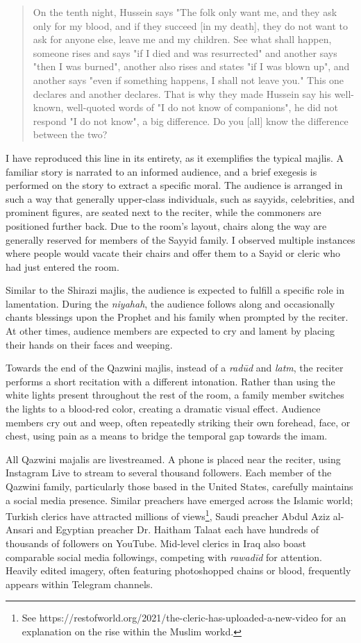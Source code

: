 \begin{quote}
On the tenth night, Hussein says "The folk only want me, and they ask only for my blood, and if they succeed [in my death], they do not want to ask for anyone else, leave me and my children. See what shall happen, someone rises and says "if I died and was resurrected" and another says "then I was burned", another also rises and states "if I was blown up", and another says "even if something happens, I shall not leave you." This one declares and another declares. That is why they made Hussein say his well-known, well-quoted words of "I do not know of companions", he did not respond "I do not know", a big difference. Do you [all] know the difference between the two?
\end{quote}

I have reproduced this line in its entirety, as it exemplifies the typical majlis. A familiar story is narrated to an informed audience, and a brief exegesis is performed on the story to extract a specific moral. The audience is arranged in such a way that generally upper-class individuals, such as sayyids, celebrities, and prominent figures, are seated next to the reciter, while the commoners are positioned further back. Due to the room's layout, chairs along the way are generally reserved for members of the Sayyid family. I observed multiple instances where people would vacate their chairs and offer them to a Sayid or cleric who had just entered the room.

Similar to the Shirazi majlis, the audience is expected to fulfill a specific role in lamentation. During the \emph{niyahah}, the audience follows along and occasionally chants blessings upon the Prophet and his family when prompted by the reciter. At other times, audience members are expected to cry and lament by placing their hands on their faces and weeping.

Towards the end of the Qazwini majlis, instead of a \emph{radūd} and \emph{latm}, the reciter performs a short recitation with a different intonation. Rather than using the white lights present throughout the rest of the room, a family member switches the lights to a blood-red color, creating a dramatic visual effect. Audience members cry out and weep, often repeatedly striking their own forehead, face, or chest, using pain as a means to bridge the temporal gap towards the imam.

All Qazwini majalis are livestreamed. A phone is placed near the reciter, using Instagram Live to stream to several thousand followers. Each member of the Qazwini family, particularly those based in the United States, carefully maintains a social media presence. Similar preachers have emerged across the Islamic world; Turkish clerics have attracted millions of views\footnote{See https://restofworld.org/2021/the-cleric-has-uploaded-a-new-video for an explanation on the rise within the Muslim workd.}, Saudi preacher Abdul Aziz al-Ansari and Egyptian preacher Dr. Haitham Talaat each have hundreds of thousands of followers on YouTube. Mid-level clerics in Iraq also boast comparable social media followings, competing with \emph{rawadīd} for attention. Heavily edited imagery, often featuring photoshopped chains or blood, frequently appears within Telegram channels.

